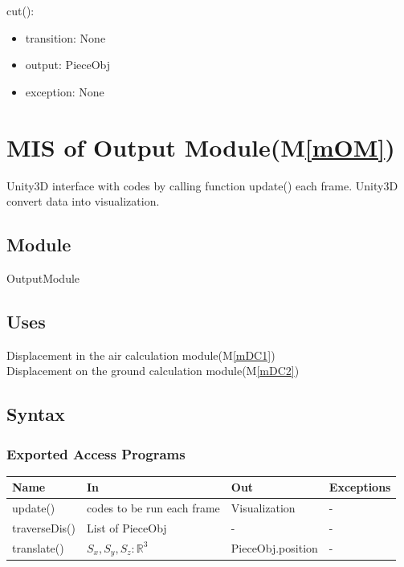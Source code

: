 \documentclass[12pt, titlepage]{article}
\newcommand{\mref}[1]{M\ref{#1}}
\begin{document}
\noindent cut():
\begin{itemize}
	\item transition: None
	\item output: PieceObj 
	\item exception: None 
\end{itemize}

\section{MIS of Output Module(\mref{mOM})}

Unity3D interface with codes by calling function update() each frame. Unity3D convert data into visualization.

\subsection{Module}

OutputModule

\subsection{Uses}

Displacement in the air calculation module(\mref{mDC1})\\
Displacement on the ground calculation module(\mref{mDC2})\\

\subsection{Syntax}

\subsubsection{Exported Access Programs}

\begin{center}
	\begin{tabular}{p{2cm} p{4cm} p{4cm} p{2cm}}
		\hline
		\textbf{Name} & \textbf{In} & \textbf{Out} & \textbf{Exceptions} \\
		\hline
		update() & codes to be run each frame & Visualization & - \\
		traverseDis() & List of PieceObj & - & - \\
		translate() & $S_{x}, S_{y}, S_{z}: \mathbb{R}^{3}$ & PieceObj.position & - \\
		\hline
	\end{tabular}
\end{center}
\end{document}
